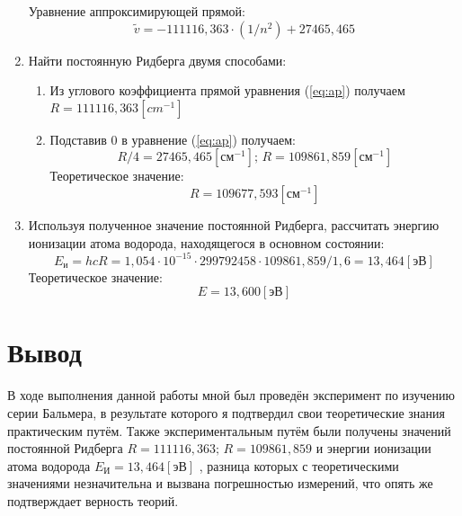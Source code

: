 \documentclass[12pt]{article}
\let\oldref\ref
\renewcommand{\ref}[1]{(\oldref{#1})}
\begin{document}
\begin{enumerate}[wide, labelwidth=!, labelindent=0pt]
        Уравнение аппроксимирующей прямой: 
        \begin{equation}
            \label{eq:ap}
            \widetilde{v} = -111116,363 \cdot (1/n^2) +27465,465
        \end{equation}
        \item Найти постоянную Ридберга двумя способами: 
        \begin{enumerate}
            \item Из углового коэффициента прямой уравнения \ref{eq:ap} получаем $ R =  111116,363 [cm^{-1}]$
            \item Подставив $ 0 $ в уравнение \ref{eq:ap} получаем:
            \begin{equation*}
                R/4 =  27465,465 [см^{-1}]                 
                ; \, R = 109861,859 [см^{-1}]
            \end{equation*}
            Теоретическое значение:
            \begin{equation*}
                R = 109677,593 [см^{-1}]
            \end{equation*}
        \end{enumerate}
        \item Используя  полученное  значение  постоянной  Ридберга, рассчитать энергию ионизации атома водорода, находящегося в основном состоянии:
        \begin{equation*}
            E_и = hcR =  1,054 \cdot 10^{-15} \cdot 299792458 \cdot 109861,859 / 1,6 = 13,464[эВ]
        \end{equation*}
        Теоретическое значение:
            \begin{equation*}
                E =  13,600[эВ] 
            \end{equation*}
    \end{enumerate}
    \section*{Вывод}
    В ходе выполнения данной работы мной был проведён эксперимент по изучению серии Бальмера, в результате которого я подтвердил свои теоретические знания практическим путём. Также экспериментальным путём были получены значений постоянной Ридберга 
    $ R = 111116,363; \,R = 109861,859 $
    и энергии ионизации атома водорода
    $ E_И = 13,464[эВ] $ 
    , разница которых с теоретическими значениями незначительна и вызвана погрешностью измерений, что опять же подтверждает верность теорий.  
\end{document}
